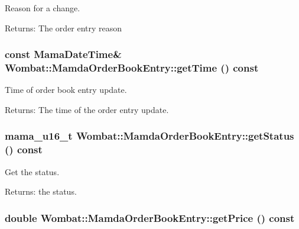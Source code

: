 Reason for a change. 

\begin{Desc}
\item[Returns:]The order entry reason \end{Desc}
\hypertarget{classWombat_1_1MamdaOrderBookEntry_8b116df66b253570f5be048ce8e49ade}{
\subsubsection[getTime]{\setlength{\rightskip}{0pt plus 5cm}const Mama\-Date\-Time\& Wombat::Mamda\-Order\-Book\-Entry::get\-Time () const}}
\label{classWombat_1_1MamdaOrderBookEntry_8b116df66b253570f5be048ce8e49ade}


Time of order book entry update. 

\begin{Desc}
\item[Returns:]The time of the order entry update. \end{Desc}
\hypertarget{classWombat_1_1MamdaOrderBookEntry_03034329cb1dffcf13c4f9521d51532b}{
\subsubsection[getStatus]{\setlength{\rightskip}{0pt plus 5cm}mama\_\-u16\_\-t Wombat::Mamda\-Order\-Book\-Entry::get\-Status () const}}
\label{classWombat_1_1MamdaOrderBookEntry_03034329cb1dffcf13c4f9521d51532b}


Get the status. 

\begin{Desc}
\item[Returns:]the status. \end{Desc}
\hypertarget{classWombat_1_1MamdaOrderBookEntry_f1538d504b6b16b45d44a9d9137e899c}{
\subsubsection[getPrice]{\setlength{\rightskip}{0pt plus 5cm}double Wombat::Mamda\-Order\-Book\-Entry::get\-Price () const}}
\label{classWombat_1_1MamdaOrderBookEntry_f1538d504b6b16b45d44a9d9137e899c}


